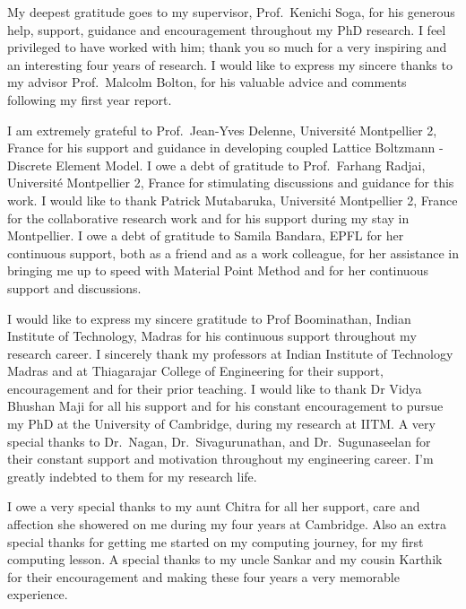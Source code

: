 
\begin{acknowledgements}      

My deepest gratitude goes to my supervisor, Prof.~Kenichi Soga, for his 
generous help, support, guidance and encouragement throughout my PhD research. 
I feel privileged to have worked with him; thank you so much for a very 
inspiring and an interesting four years of research. I would like to express my sincere thanks to my advisor Prof.~Malcolm Bolton, for his valuable advice and comments following my first year report.

I am extremely grateful to Prof.~Jean-Yves Delenne, Universit\'{e} Montpellier 
2, France for his support and guidance in developing coupled Lattice Boltzmann 
- Discrete Element Model. I owe a debt of gratitude to Prof.~Farhang Radjai, 
Universit\'{e} Montpellier 2, France for stimulating discussions and guidance 
for this work. I would like to thank Patrick Mutabaruka, Universit\'{e} 
Montpellier 2, France for the collaborative research work and for his support 
during my stay in Montpellier. I owe a debt of gratitude to Samila Bandara, 
EPFL for her continuous support, both as a friend and as a work colleague, for 
her assistance in bringing me up to speed with Material Point Method and for 
her continuous support and discussions.

I would like to express my sincere gratitude to Prof Boominathan, Indian 
Institute of Technology, Madras for his continuous support throughout my 
research career. I sincerely thank my professors at Indian Institute of 
Technology Madras and at Thiagarajar College of Engineering for their support, 
encouragement and for their prior teaching. I would like to thank Dr Vidya 
Bhushan Maji for all his support and for his constant encouragement to pursue 
my PhD at the University of Cambridge, during my research at IITM. A very 
special thanks to Dr.~Nagan, Dr.~Sivagurunathan, and Dr.~Sugunaseelan for their 
constant support and motivation throughout my engineering career. I'm greatly 
indebted to them for my research life.

I owe a very special thanks to my aunt Chitra for all her support, care and 
affection she showered on me during my four years at Cambridge. Also an extra 
special thanks for getting me started on my computing journey, for my first 
computing lesson. A special thanks to my uncle Sankar and my cousin Karthik for 
their encouragement and making these four years a very memorable 
experience.


\end{acknowledgements}
